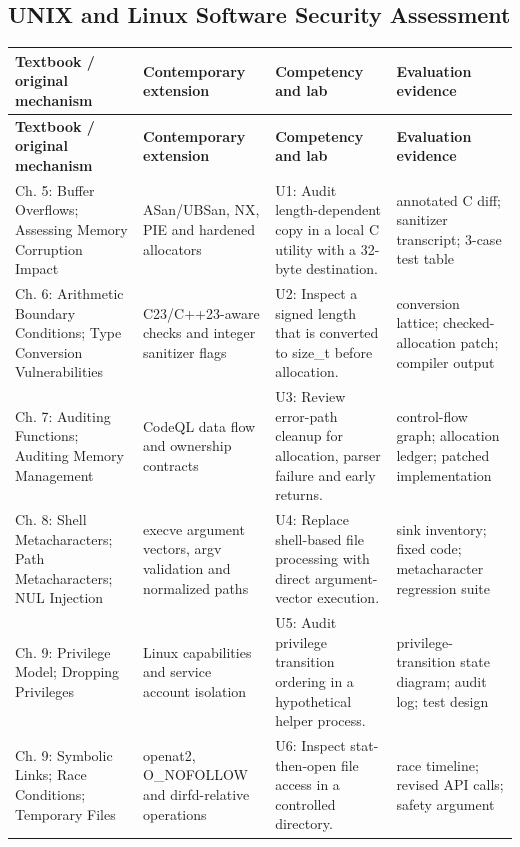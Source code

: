 \documentclass[10pt,letterpaper]{article}
\begin{document}
\subsection{UNIX and Linux Software Security Assessment}
\begingroup\footnotesize\setlength\tabcolsep{3pt}
\begin{longtable}{>{\raggedright\arraybackslash}p{}>{\raggedright\arraybackslash}p{}>{\raggedright\arraybackslash}p{}>{\raggedright\arraybackslash}p{}}\toprule
\textbf{Textbook / original mechanism} & \textbf{Contemporary extension} & \textbf{Competency and lab} & \textbf{Evaluation evidence}\\\midrule\endfirsthead
\toprule \textbf{Textbook / original mechanism} & \textbf{Contemporary extension} & \textbf{Competency and lab} & \textbf{Evaluation evidence}\\\midrule\endhead
Ch. 5: Buffer Overflows; Assessing Memory Corruption Impact & ASan/UBSan, NX, PIE and hardened allocators & U1: Audit length-dependent copy in a local C utility with a 32-byte destination. & annotated C diff; sanitizer transcript; 3-case test table\\\midrule
Ch. 6: Arithmetic Boundary Conditions; Type Conversion Vulnerabilities & C23/C++23-aware checks and integer sanitizer flags & U2: Inspect a signed length that is converted to size\_t before allocation. & conversion lattice; checked-allocation patch; compiler output\\\midrule
Ch. 7: Auditing Functions; Auditing Memory Management & CodeQL data flow and ownership contracts & U3: Review error-path cleanup for allocation, parser failure and early returns. & control-flow graph; allocation ledger; patched implementation\\\midrule
Ch. 8: Shell Metacharacters; Path Metacharacters; NUL Injection & execve argument vectors, argv validation and normalized paths & U4: Replace shell-based file processing with direct argument-vector execution. & sink inventory; fixed code; metacharacter regression suite\\\midrule
Ch. 9: Privilege Model; Dropping Privileges & Linux capabilities and service account isolation & U5: Audit privilege transition ordering in a hypothetical helper process. & privilege-transition state diagram; audit log; test design\\\midrule
Ch. 9: Symbolic Links; Race Conditions; Temporary Files & openat2, O\_NOFOLLOW and dirfd-relative operations & U6: Inspect stat-then-open file access in a controlled directory. & race timeline; revised API calls; safety argument\\\midrule

\end{longtable}
\end{document}
